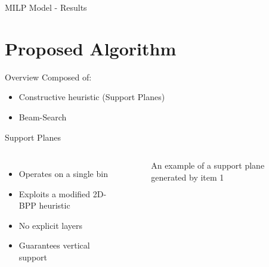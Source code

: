 \documentclass{beamer}
\begin{document}
    \begin{frame}{MILP Model - Results}
        
    \end{frame}

    \section{Proposed Algorithm}
    \begin{frame}{Overview}
        Composed of:
        \begin{itemize}
            \item Constructive heuristic (Support Planes)
            \item Beam-Search
        \end{itemize}
    \end{frame}
    \begin{frame}{Support Planes}
        \begin{columns}[onlytextwidth,T]
            \column{\dimexpr\linewidth-65mm-5mm}
            \begin{itemize}
                \item Operates on a single bin
                \item Exploits a modified 2D-BPP heuristic
                \item No explicit layers
                \item Guarantees vertical support
            \end{itemize}
            \column{65mm}
                \begin{figure}[h]
                    \resizebox*{\columnwidth}{!}{%
                    
                    }
                    \caption{An example of a support plane generated by item 1}
                    \label{fig:heur_scheme}
                \end{figure}
            \end{columns}
    \end{frame}
    
\end{document}
